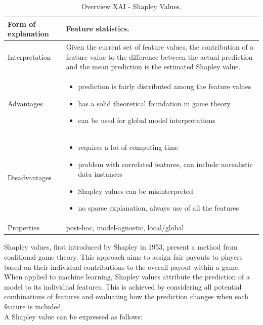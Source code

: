 \begin{table}[H]
  \centering
  \begin{tabular}{|p{}|p{}|}
    \hline
    Form of \newline explanation & 
    Feature statistics. \\
    
    \hline
    Interpretation & 
    Given the current set of feature values, the contribution of a feature value to the difference between the actual prediction and the mean prediction is the estimated Shapley value. \\
    \hline
    Advantages &
    \begin{itemize}[nosep, left=0em]
        \item prediction is fairly distributed among the feature values
        \item has a solid theoretical foundation in game theory
        \item can be used for global model interpretations
    \end{itemize} \\
    
    \hline
    Disadvantages &
    \begin{itemize}[nosep, left=0em]
        \item requires a lot of computing time
        \item problem with correlated features, can include unrealistic data instances
        \item Shapley values can be misinterpreted
        \item no sparse explanation, always use of all the features
    \end{itemize} \\
    
    \hline
    Properties & 
    post-hoc, model-agnostic, local/global  \\
    
    \hline
  \end{tabular}
  \caption{Overview XAI - Shapley Values.}
  \label{tab:XAIShapVal}
\end{table}

Shapley values, first introduced by Shapley \cite{shapley1953value} in 1953, present a method from coalitional game theory. This approach aims to assign fair payouts to players based on their individual contributions to the overall payout within a game. When applied to machine learning, Shapley values attribute the prediction of a model to its individual features. This is achieved by considering all potential combinations of features and evaluating how the prediction changes when each feature is included.\\
A Shapley value can be expressed as follows:

